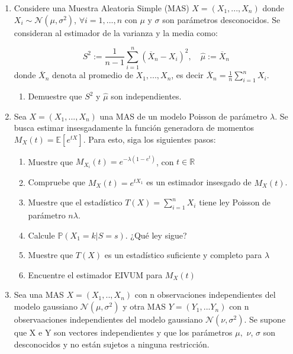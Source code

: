 \begin{enumerate}

\item Considere una Muestra Aleatoria Simple (MAS) $X=(X_1,...,X_n)$ donde $X_i\sim\mathcal{N}(\mu, \sigma^2)$, $\forall i =1,...,n$ con $\mu$ y $\sigma$ son parámetros desconocidos. Se consideran al estimador de la varianza y la media como:

\[S^2 := \frac{1}{n-1}\sum\limits_{i=1}^{n}(\overline{X}_n-X_i)^2, \quad \hat{\mu} := \overline{X}_n \]
donde $\overline{X}_n$ denota al promedio de $X_1,..., X_n$, es decir  $\overline{X}_n = \frac{1}{n}\sum\limits_{i=1}^{n}X_i$. 

\begin{enumerate}
    \item Demuestre que $S^2$ y $\hat{\mu}$ son independientes.
\end{enumerate}

\item Sea $X=(X_1,...,X_n)$ una MAS de un modelo Poisson de parámetro $\lambda$. Se busca estimar insesgadamente la función generadora de momentos $M_{X}(t)=\mathbb{E}[e^{tX}]$. Para esto, siga los siguientes pasos:

\begin{enumerate}
    \item Muestre que $M_{X_i}(t)=e^{-\lambda (1-e^t)}$, con $t\in \mathbb{R}$
    \item Compruebe que $\widehat{M_{X}}(t)=e^{t X_1}$ es un estimador insesgado de $M_{X}(t)$.
    \item Muestre que el estadístico $T(X)=\sum\limits_{i=1}^{n}X_i$ tiene ley Poisson de parámetro $n \lambda$.
    \item Calcule $\mathbb{P}(X_1 =k | S=s)$. ¿Qué ley sigue?
    \item Muestre que $T(X)$ es un estadístico suficiente y completo para $\lambda$
    \item Encuentre el estimador EIVUM para $M_{X}(t)$
\end{enumerate}

\item Sea una MAS $X=(X_1,..,X_n)$ con n observaciones independientes del modelo gaussiano $\mathcal{N}(\mu,\sigma^2)$ y otra MAS $Y=(Y_1,...Y_n)$ con n observaaciones independientes del modelo gaussiano $\mathcal{N}(\nu,\sigma^2)$. Se supone que X e Y son vectores independientes y que los parámetros $\mu,$ $\nu$, $\sigma$ son desconocidos y no están sujetos a ninguna restricción.


\end{enumerate}

